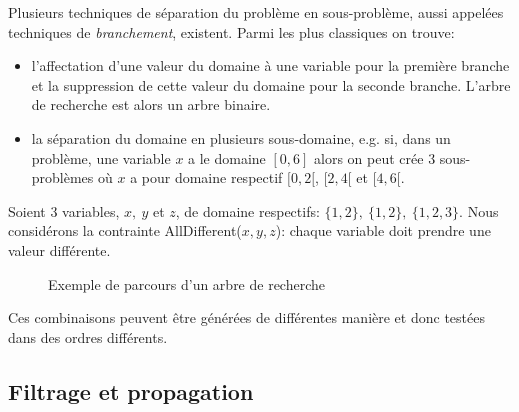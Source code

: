 Plusieurs techniques de séparation du problème en sous-problème, aussi
appelées techniques de {\it branchement}, existent. Parmi les plus
classiques on trouve:
\begin{itemize}
\item l'affectation d'une valeur du domaine à une variable pour la
  première branche et la suppression de cette valeur du domaine pour
  la seconde branche. L'arbre de recherche est alors un arbre binaire.
\item la séparation du domaine en plusieurs sous-domaine, e.g. si,
dans un problème, une variable $x$ a le domaine $[0,6]$ alors on peut
crée $3$ sous-problèmes où $x$ a pour domaine respectif $[0,2[$,
$[2,4[$ et $[4,6[$. 
\end{itemize}

\begin{ex}
Soient $3$ variables, $x,\ y$ et $z$, de domaine
respectifs: $\{1,2\},\ \{1,2\},\ \{1,2,3\}$. Nous considérons la
contrainte AllDifferent($x,y,z$): chaque variable doit prendre une
valeur différente.   
  \begin{figure}[!htb]
    \centering
    \caption{Exemple de parcours d'un arbre de recherche}
    \label{fig:ex_tree}
  \end{figure}
\end{ex}

Ces combinaisons peuvent être générées de différentes manière et donc
testées dans des ordres différents. 



\subsection{Filtrage et propagation}
\label{sec:PPC_propag}

